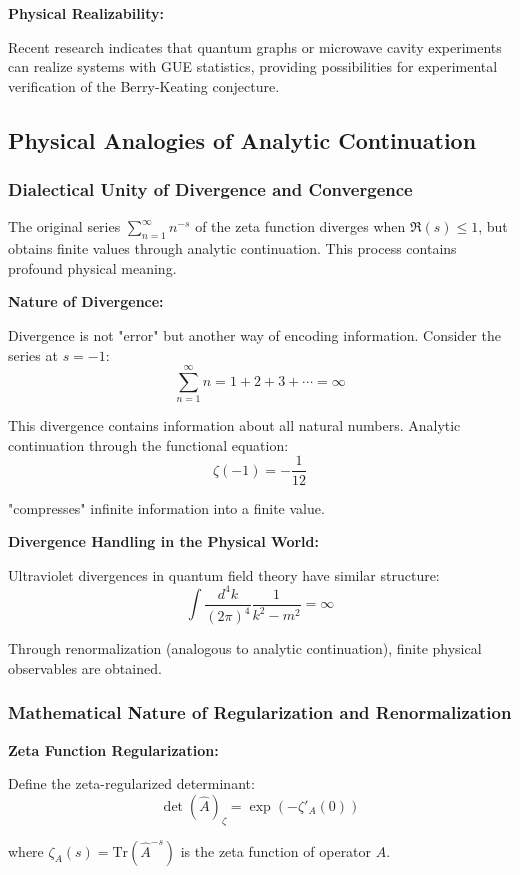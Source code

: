 \documentclass[11pt]{article}
\theoremstyle{plain}
\theoremstyle{definition}
\theoremstyle{remark}
\begin{document}
\textbf{Physical Realizability:}

Recent research indicates that quantum graphs or microwave cavity experiments can realize systems with GUE statistics, providing possibilities for experimental verification of the Berry-Keating conjecture.

\subsection{Physical Analogies of Analytic Continuation}

\subsubsection{Dialectical Unity of Divergence and Convergence}

The original series $\sum_{n=1}^{\infty} n^{-s}$ of the zeta function diverges when $\Re(s) \leq 1$, but obtains finite values through analytic continuation. This process contains profound physical meaning.

\textbf{Nature of Divergence:}

Divergence is not "error" but another way of encoding information. Consider the series at $s = -1$:
$$\sum_{n=1}^{\infty} n = 1 + 2 + 3 + \cdots = \infty$$

This divergence contains information about all natural numbers. Analytic continuation through the functional equation:
$$\zeta(-1) = -\frac{1}{12}$$

"compresses" infinite information into a finite value.

\textbf{Divergence Handling in the Physical World:}

Ultraviolet divergences in quantum field theory have similar structure:
$$\int \frac{d^4k}{(2\pi)^4} \frac{1}{k^2 - m^2} = \infty$$

Through renormalization (analogous to analytic continuation), finite physical observables are obtained.

\subsubsection{Mathematical Nature of Regularization and Renormalization}

\textbf{Zeta Function Regularization:}

Define the zeta-regularized determinant:
$$\det(\hat{A})_\zeta = \exp(-\zeta'_A(0))$$

where $\zeta_A(s) = \text{Tr}(\hat{A}^{-s})$ is the zeta function of operator $A$.
\end{document}

